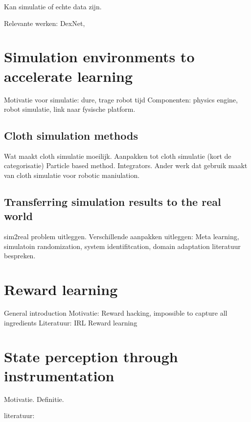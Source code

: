 \documentclass[\home/main.tex]{subfiles}
\begin{document}
Kan simulatie of echte data zijn. 

Relevante werken:
	DexNet, 

\section{Simulation environments to accelerate learning} \label{sec:lit_simulation}

Motivatie voor simulatie: dure, trage robot tijd 
Componenten: physics engine, robot simulatie, link naar fysische platform.

\subsection{Cloth simulation methods} \label{subsec:lit_cloth_sim}

Wat maakt cloth simulatie moeilijk. 
Aanpakken tot cloth simulatie (kort de categorisatie)
Particle based method. 
Integrators. 
Ander werk dat gebruik maakt van cloth simulatie voor robotic maniulation.

\subsection{Transferring simulation results to the real world}  \label{sec:lit_sim2real}
sim2real problem uitleggen.
Verschillende aanpakken uitleggen: Meta learning, simulatoin randomization, system identifitcation, domain adaptation
literatuur bespreken. 

\section{Reward learning}  \label{sec:lit_reward_learning}
General introduction 
Motivatie: Reward hacking, impossible to capture all ingredients
Literatuur: 
	IRL 
	Reward learning 

\section{State perception through instrumentation} \label{sec:lit_instrumentation}
Motivatie.
Definitie.

literatuur:
\end{document}
